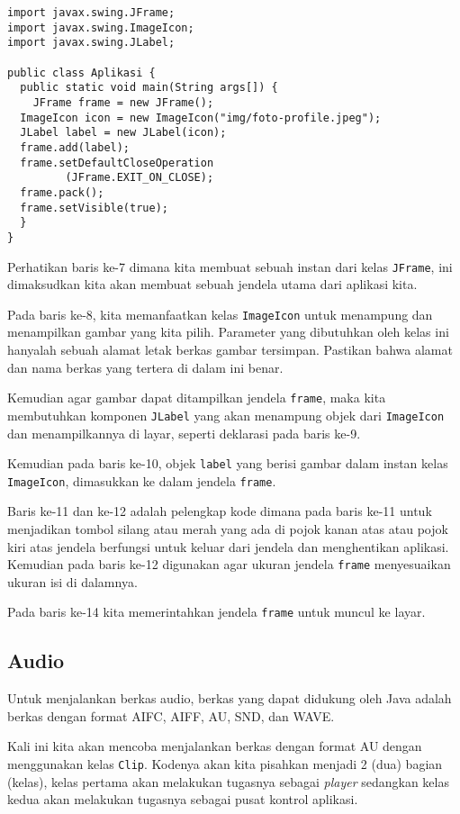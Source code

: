 \begin{lstlisting}
import javax.swing.JFrame;
import javax.swing.ImageIcon;
import javax.swing.JLabel;

public class Aplikasi {
  public static void main(String args[]) {
    JFrame frame = new JFrame();
  ImageIcon icon = new ImageIcon("img/foto-profile.jpeg");
  JLabel label = new JLabel(icon);
  frame.add(label);
  frame.setDefaultCloseOperation
         (JFrame.EXIT_ON_CLOSE);
  frame.pack();
  frame.setVisible(true);
  }
}
\end{lstlisting}

Perhatikan baris ke-7 dimana kita membuat sebuah instan dari kelas \texttt{JFrame}, ini dimaksudkan kita akan membuat sebuah jendela utama dari aplikasi kita.

Pada baris ke-8, kita memanfaatkan kelas \texttt{ImageIcon} untuk menampung dan menampilkan gambar yang kita pilih. Parameter yang dibutuhkan oleh kelas ini hanyalah sebuah alamat letak berkas gambar tersimpan. Pastikan bahwa alamat dan nama berkas yang tertera di dalam ini benar.

Kemudian agar gambar dapat ditampilkan jendela \texttt{frame}, maka kita membutuhkan komponen \texttt{JLabel} yang akan menampung objek dari \texttt{ImageIcon} dan menampilkannya di layar, seperti deklarasi pada baris ke-9.

Kemudian pada baris ke-10, objek \texttt{label} yang berisi gambar dalam instan kelas \texttt{ImageIcon}, dimasukkan ke dalam jendela \texttt{frame}.

Baris ke-11 dan ke-12 adalah pelengkap kode dimana pada baris ke-11 untuk menjadikan tombol silang atau merah yang ada di pojok kanan atas atau pojok kiri atas jendela berfungsi untuk keluar dari jendela dan menghentikan aplikasi. Kemudian pada baris ke-12 digunakan agar ukuran jendela \texttt{frame} menyesuaikan ukuran isi di dalamnya.

Pada baris ke-14 kita memerintahkan jendela \texttt{frame} untuk muncul ke layar.

\subsection{Audio}

Untuk menjalankan berkas audio, berkas yang dapat didukung oleh Java adalah berkas dengan format AIFC, AIFF, AU, SND, dan WAVE.

Kali ini kita akan mencoba menjalankan berkas dengan format AU dengan menggunakan kelas \texttt{Clip}. Kodenya akan kita pisahkan menjadi 2 (dua) bagian (kelas), kelas pertama akan melakukan tugasnya sebagai \textit{player} sedangkan kelas kedua akan melakukan tugasnya sebagai pusat kontrol aplikasi.

